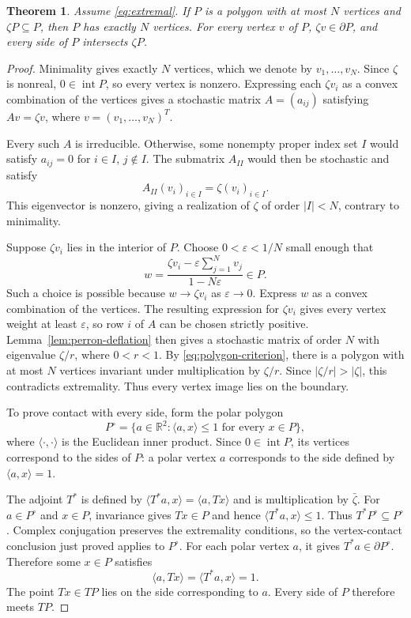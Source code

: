 \documentclass[11pt,a4paper]{article}
\newcommand{\R}{\mathbb R}
\newtheorem{theorem}{Theorem}[section]
\theoremstyle{definition}
\theoremstyle{remark}
\numberwithin{equation}{section}
\begin{document}
\begin{theorem}\label{thm:saturation}
Assume \eqref{eq:extremal}. If $P$ is a polygon with at most $N$ vertices and $\zeta P\subseteq P$, then $P$ has exactly $N$ vertices. For every vertex $v$ of $P$, $\zeta v\in\partial P$, and every side of $P$ intersects $\zeta P$.
\end{theorem}
\begin{proof}
Minimality gives exactly $N$ vertices, which we denote by $v_1,\ldots,v_N$. Since $\zeta$ is nonreal, $0\in\operatorname{int}P$, so every vertex is nonzero. Expressing each $\zeta v_i$ as a convex combination of the vertices gives a stochastic matrix $A=(a_{ij})$ satisfying $Av=\zeta v$, where $v=(v_1,\ldots,v_N)^T$.

Every such $A$ is irreducible. Otherwise, some nonempty proper index set $I$ would satisfy $a_{ij}=0$ for $i\in I$, $j\notin I$. The submatrix $A_{II}$ would then be stochastic and satisfy
\[
 A_{II}(v_i)_{i\in I}=\zeta(v_i)_{i\in I}.
\]
This eigenvector is nonzero, giving a realization of $\zeta$ of order $|I|<N$, contrary to minimality.

Suppose $\zeta v_i$ lies in the interior of $P$. Choose $0<\varepsilon<1/N$ small enough that
\[
 w=\frac{\zeta v_i-\varepsilon\sum_{j=1}^N v_j}{1-N\varepsilon}
 \in P.
\]
Such a choice is possible because $w\to\zeta v_i$ as $\varepsilon\to0$. Express $w$ as a convex combination of the vertices. The resulting expression for $\zeta v_i$ gives every vertex weight at least $\varepsilon$, so row $i$ of $A$ can be chosen strictly positive. Lemma~\ref{lem:perron-deflation} then gives a stochastic matrix of order $N$ with eigenvalue $\zeta/r$, where $0<r<1$. By \eqref{eq:polygon-criterion}, there is a polygon with at most $N$ vertices invariant under multiplication by $\zeta/r$. Since $|\zeta/r|>|\zeta|$, this contradicts extremality. Thus every vertex image lies on the boundary.

To prove contact with every side, form the polar polygon
\[
 P^\circ=\{a\in\R^2:\langle a,x\rangle\le1
                    \text{ for every }x\in P\},
\]
where $\langle\cdot,\cdot\rangle$ is the Euclidean inner product. Since $0\in\operatorname{int}P$, its vertices correspond to the sides of $P$: a polar vertex $a$ corresponds to the side defined by $\langle a,x\rangle=1$.

The adjoint $T^*$ is defined by $\langle T^*a,x\rangle=\langle a,Tx\rangle$ and is multiplication by $\bar\zeta$. For $a\in P^\circ$ and $x\in P$, invariance gives $Tx\in P$ and hence $\langle T^*a,x\rangle\le1$. Thus $T^*P^\circ\subseteq P^\circ$. Complex conjugation preserves the extremality conditions, so the vertex-contact conclusion just proved applies to $P^\circ$. For each polar vertex $a$, it gives $T^*a\in\partial P^\circ$. Therefore some $x\in P$ satisfies
\[
 \langle a,Tx\rangle=\langle T^*a,x\rangle=1.
\]
The point $Tx\in TP$ lies on the side corresponding to $a$. Every side of $P$ therefore meets $TP$.
\end{proof}
\end{document}

